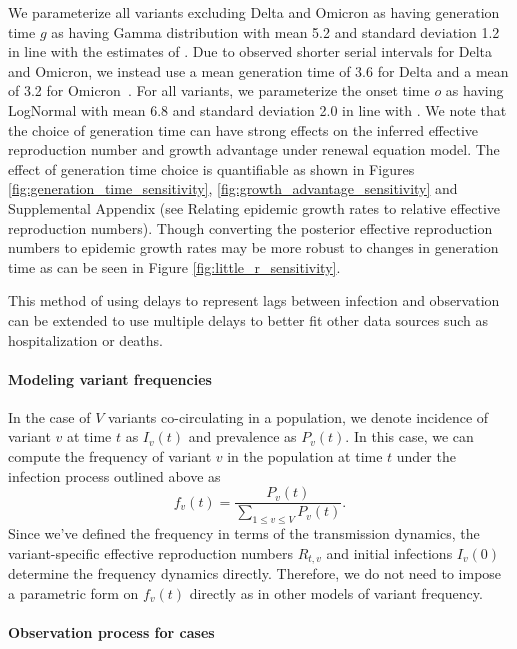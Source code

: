 \documentclass[11pt,oneside,letterpaper]{article}
\begin{document}
We parameterize all variants excluding Delta and Omicron as having generation time $g$ as having Gamma distribution with mean 5.2 and standard deviation 1.2 in line with the estimates of \cite{Ganyani2020}.
Due to observed shorter serial intervals for Delta and Omicron, we instead use a mean generation time of 3.6 for Delta and a mean of 3.2 for Omicron\ \cite{Backer2022, Ryu2022, Song2022}.
For all variants, we parameterize the onset time $o$ as having LogNormal with mean 6.8 and standard deviation 2.0 in line with \cite{Cheng2021}.
We note that the choice of generation time can have strong effects on the inferred effective reproduction number and growth advantage under renewal equation model.
The effect of generation time choice is quantifiable as shown in Figures \ref{fig:generation_time_sensitivity}, \ref{fig:growth_advantage_sensitivity} and Supplemental Appendix (see Relating epidemic growth rates to relative effective reproduction numbers).
Though converting the posterior effective reproduction numbers to epidemic growth rates may be more robust to changes in generation time as can be seen in Figure \ref{fig:little_r_sensitivity}.

This method of using delays to represent lags between infection and observation can be extended to use multiple delays to better fit other data sources such as hospitalization or deaths.

\paragraph{Modeling variant frequencies}%

In the case of $V$ variants co-circulating in a population, we denote incidence of variant $v$ at time $t$ as $I_{v}(t)$ and prevalence as $P_{v}(t)$.
In this case, we can compute the frequency of variant $v$ in the population at time $t$ under the infection process outlined above as
\begin{equation}
  f_{v}(t) = \frac{P_{v}(t)}{ \sum_{1\leq v \leq V} P_{v}(t)}.
\end{equation}
Since we've defined the frequency in terms of the transmission dynamics, the variant-specific effective reproduction numbers $R_{t,v}$ and initial infections $I_{v}(0)$ determine the frequency dynamics directly.
Therefore, we do not need to impose a parametric form on $f_{v}(t)$ directly as in other models of variant frequency.

\paragraph{Observation process for cases}%
\end{document}
